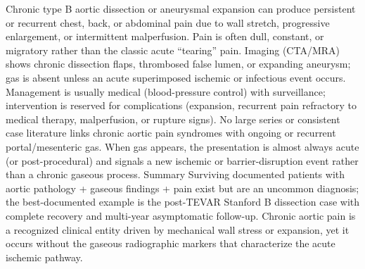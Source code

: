 Chronic type B aortic dissection or aneurysmal expansion can produce persistent or recurrent chest, back, or abdominal pain due to wall stretch, progressive enlargement, or intermittent malperfusion.
Pain is often dull, constant, or migratory rather than the classic acute “tearing” pain.
Imaging (CTA/MRA) shows chronic dissection flaps, thrombosed false lumen, or expanding aneurysm; gas is absent unless an acute superimposed ischemic or infectious event occurs.
Management is usually medical (blood-pressure control) with surveillance; intervention is reserved for complications (expansion, recurrent pain refractory to medical therapy, malperfusion, or rupture signs).
No large series or consistent case literature links chronic aortic pain syndromes with ongoing or recurrent portal/mesenteric gas. When gas appears, the presentation is almost always acute (or post-procedural) and signals a new ischemic or barrier-disruption event rather than a chronic gaseous process.
Summary
Surviving documented patients with aortic pathology + gaseous findings + pain exist but are an uncommon diagnosis; the best-documented example is the post-TEVAR Stanford B dissection case with complete recovery and multi-year asymptomatic follow-up. Chronic aortic pain is a recognized clinical entity driven by mechanical wall stress or expansion, yet it occurs without the gaseous radiographic markers that characterize the acute ischemic pathway.

